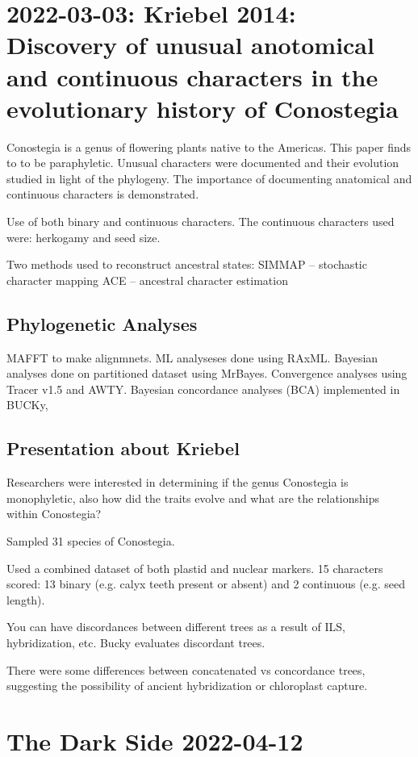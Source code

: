 \documentclass{article}
\begin{document}
\section{2022-03-03: Kriebel 2014: Discovery of unusual anotomical and
  continuous characters in the evolutionary history of Conostegia}

Conostegia is a genus of flowering plants native to the Americas. This paper
finds to to be paraphyletic. Unusual characters were documented and their
evolution studied in light of the phylogeny. The importance of documenting
anatomical and continuous characters is demonstrated.

Use of both binary and continuous characters. The continuous characters used were: herkogamy and seed size.

Two methods used to reconstruct ancestral states:
SIMMAP -- stochastic character mapping
ACE -- ancestral character estimation

\subsection{Phylogenetic Analyses}
MAFFT to make alignmnets. ML analyseses done using RAxML. Bayesian analyses done
on partitioned dataset using MrBayes. Convergence analyses using Tracer v1.5 and
AWTY. Bayesian concordance analyses (BCA) implemented in BUCKy,

\subsection{Presentation about Kriebel}

Researchers were interested in determining if the genus Conostegia is monophyletic, also how did the traits evolve and what are the relationships within Conostegia?

Sampled 31 species of Conostegia.

Used a combined dataset of both plastid and nuclear markers. 15 characters scored: 13 binary (e.g. calyx teeth present or absent) and 2 continuous (e.g. seed length). 

You can have discordances between different trees as a result of ILS, hybridization, etc. Bucky evaluates discordant trees.

There were some differences between concatenated vs concordance trees, suggesting the possibility of ancient hybridization or chloroplast capture.


\section{The Dark Side 2022-04-12}
\end{document}
